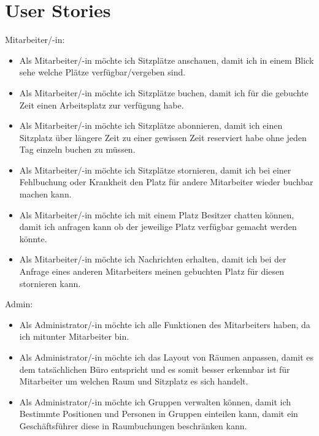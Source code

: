 \section{User Stories}

Mitarbeiter/-in:

\begin{itemize}
    \item Als Mitarbeiter/-in möchte ich Sitzplätze anschauen, damit ich in einem Blick sehe welche Plätze verfügbar/vergeben sind.

    \item Als Mitarbeiter/-in möchte ich Sitzplätze buchen, damit ich für die gebuchte Zeit einen Arbeitsplatz zur verfügung habe.

    \item Als Mitarbeiter/-in möchte ich Sitzplätze abonnieren, damit ich einen Sitzplatz über längere Zeit zu einer gewissen Zeit reserviert habe ohne jeden Tag einzeln buchen zu müssen.

    \item Als Mitarbeiter/-in möchte ich Sitzplätze stornieren, damit ich bei einer Fehlbuchung oder Krankheit den Platz für andere Mitarbeiter wieder buchbar machen kann.

    \item Als Mitarbeiter/-in möchte ich mit einem Platz Besitzer chatten können, damit ich anfragen kann ob der jeweilige Platz verfügbar gemacht werden könnte.

    \item Als Mitarbeiter/-in möchte ich Nachrichten erhalten, damit ich bei der Anfrage eines anderen Mitarbeiters meinen gebuchten Platz für diesen stornieren kann.
\end{itemize}

\noindent Admin:

\begin{itemize}
    \item Als Administrator/-in möchte ich alle Funktionen des Mitarbeiters haben, da ich mitunter Mitarbeiter bin.

    \item Als Administrator/-in möchte ich das Layout von Räumen anpassen, damit es dem tatsächlichen Büro entspricht und es somit besser erkennbar ist für Mitarbeiter um welchen Raum und Sitzplatz es sich handelt.

    \item Als Administrator/-in möchte ich Gruppen verwalten können, damit ich Bestimmte Positionen und Personen in Gruppen einteilen kann, damit ein Geschäftsführer diese in Raumbuchungen beschränken kann.
\end{itemize}

